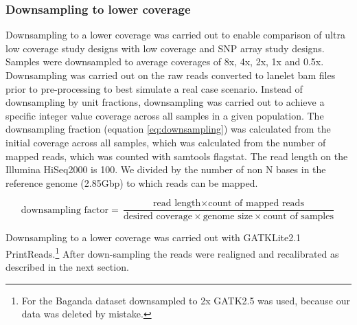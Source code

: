 \subsubsection{Downsampling to lower coverage}
\label{subsubsec:downsampling}
Downsampling to a lower coverage was carried out to enable comparison of ultra low coverage study designs with low coverage and SNP array study designs. Samples were downsampled to average coverages of 8x, 4x, 2x, 1x and 0.5x. Downsampling was carried out on the raw reads converted to lanelet bam files prior to pre-processing to best simulate a real case scenario. Instead of downsampling by unit fractions\cite{10.1371/journal.pcbi.1002604}, downsampling was carried out to achieve a specific integer value coverage across all samples in a given population. The downsampling fraction (equation \ref{eq:downsampling}) was calculated from the initial coverage across all samples, which was calculated from the number of mapped reads, which was counted with samtools\cite{Li15082009} flagstat. The read length on the Illumina HiSeq2000 is 100. We divided by the number of non N bases in the reference genome (2.85\gls{Gbp}) to which reads can be mapped.

\begin{equation}
\text{downsampling factor} =  \frac
{\text{read length} \times \text{count of mapped reads}}
{\text{desired coverage} \times \text{genome size} \times \text{count of samples}}
\label{eq:downsampling}
\end{equation}

Downsampling to a lower coverage was carried out with \gls{GATK}Lite2.1 PrintReads.\cite{DePristo2011}\footnote{For the Baganda dataset downsampled to 2x \gls{GATK}2.5 was used, because our data was deleted by mistake.}
After down-sampling the reads were realigned and recalibrated as described in the next section.


